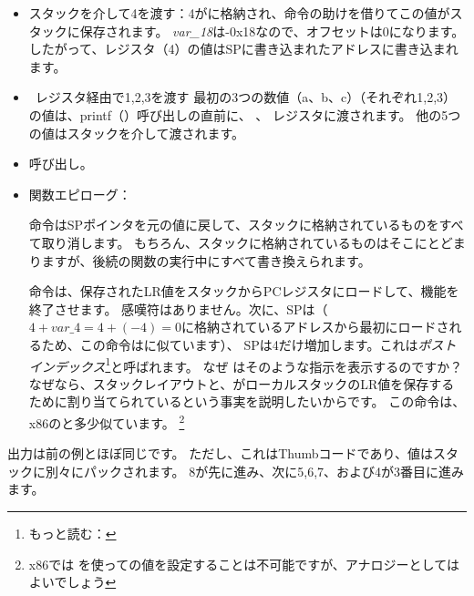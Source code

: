 \begin{itemize}
\item スタックを介して4を渡す：4がに格納され、命令の助けを借りてこの値がスタックに保存されます。
\emph{var\_18}は-0x18なので、オフセットは0になります。したがって、レジスタ（4）の値は\ac{SP}に書き込まれたアドレスに書き込まれます。

\item レジスタ経由で1,2,3を渡す
最初の3つの数値（a、b、c）（それぞれ1,2,3）の値は、printf（）呼び出しの直前に、 、 レジスタに渡されます。
他の5つの値はスタックを介して渡されます。

\item \printf 呼び出し。

\item 関数エピローグ：

命令は\ac{SP}ポインタを元の値に戻して、スタックに格納されているものをすべて取り消します。
もちろん、スタックに格納されているものはそこにとどまりますが、後続の関数の実行中にすべて書き換えられます。

命令は、保存された\ac{LR}値をスタックから\ac{PC}レジスタにロードして、機能を終了させます。
感嘆符はありません。次に、\ac{SP}は（$4+var\_4=4+(-4)=0$に格納されているアドレスから最初にロードされるため、この命令はに似ています）、 \ac{SP}は4だけ増加します。これは\emph{ポストインデックス}\footnote{もっと読む： }と呼ばれます。
なぜ \IDA はそのような指示を表示するのですか？
なぜなら、スタックレイアウトと、がローカルスタックの\ac{LR}値を保存するために割り当てられているという事実を説明したいからです。
この命令は、x86のと多少似ています。
\footnote{x86では \POP を使っての値を設定することは不可能ですが、アナロジーとしてはよいでしょう}

\end{itemize}

\myparagraph{\OptimizingKeilVI: \ThumbMode}



出力は前の例とほぼ同じです。 ただし、これはThumbコードであり、値はスタックに別々にパックされます。
8が先に進み、次に5,6,7、および4が3番目に進みます。

\myparagraph{\OptimizingXcodeIV: \ARMMode}

